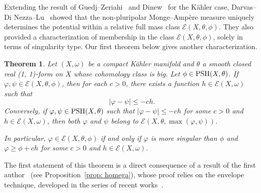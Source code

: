 \documentclass[a4paper]{amsart}
\numberwithin{equation}{section}
\newtheorem{theorem}{Theorem}[section]
\theoremstyle{definition}
\numberwithin{equation}{section}
\newcommand{\PSH}{{\rm PSH}}
\begin{document}
Extending the result of Guedj--Zeriahi~\cite{guedj2007weighted} and Dinew~\cite{dinew2009uniqueness} for the K\"ahler case, Darvas--Di Nezza--Lu~\cite{darvas2018monotonicity,darvas2021log} 
 showed that the non-pluripolar Monge--Ampère measure uniquely determines the potential within a relative full mass class $\mathcal{E}(X,\theta,\phi)$. 
They also provided a characterization of membership in the class $\mathcal{E}(X,\theta,\phi)$, solely in terms of singularity type. Our first theorem below gives another characterization.
\begin{theorem}\label{thm: thm1}
Let $(X, \omega)$ be a compact K\"{a}hler manifold and $\theta$ a smooth closed real (1, 1)-form on $X$ whose cohomology class is big.
Let $\phi\in\PSH(X,\theta)$. If $\varphi,\psi\in\mathcal{E}(X,\theta,\phi)$, then for each $c>0$, there exists a function $ h\in\mathcal{E}(X,\omega)$ such that $$|\varphi-\psi|\leq -ch.$$
Conversely, if $\varphi,\psi\in\PSH(X,\theta)$ such that $|\varphi-\psi|\leq -ch$ for some $c>0$ and $h\in\mathcal{E}(X,\omega)$, then both $\varphi$ and $\psi$ belong to $\mathcal{E}(X,\theta,\max(\varphi,\psi))$.

In particular, $\varphi\in\mathcal{E}(X,\theta,\phi)$ if and only if $\varphi$ is more singular than $\phi$ and $\varphi\geq \phi+ch $ for some $c>0$ and $h\in\mathcal{E}(X,\omega)$.
\end{theorem}  
The first statement of this theorem is a direct consequence of a result of the first author~\cite{dang2021continuity} (see Proposition~\ref{prop: homega}), whose proof relies on the envelope technique, developed in the series of recent works~\cite{darvas2018singularity,darvas2018monotonicity,darvas2020metric}. 
\end{document}
